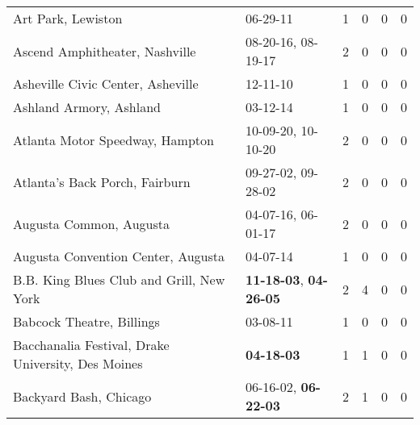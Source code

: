 \begin{longtable}{p{}p{}p{}p{}p{}p{}}
                                                           Art Park, Lewiston &                                                06-29-11\textsuperscript{} &  1 &  0 &  0 &  0 \\
                                               Ascend Amphitheater, Nashville &                    08-20-16\textsuperscript{}, 08-19-17\textsuperscript{} &  2 &  0 &  0 &  0 \\
                                            Asheville Civic Center, Asheville &                                                12-11-10\textsuperscript{} &  1 &  0 &  0 &  0 \\
                                                      Ashland Armory, Ashland &                                                03-12-14\textsuperscript{} &  1 &  0 &  0 &  0 \\
                                              Atlanta Motor Speedway, Hampton &                    10-09-20\textsuperscript{}, 10-10-20\textsuperscript{} &  2 &  0 &  0 &  0 \\
                                               Atlanta's Back Porch, Fairburn &                    09-27-02\textsuperscript{}, 09-28-02\textsuperscript{} &  2 &  0 &  0 &  0 \\
                                                      Augusta Common, Augusta &                    04-07-16\textsuperscript{}, 06-01-17\textsuperscript{} &  2 &  0 &  0 &  0 \\
                                           Augusta Convention Center, Augusta &                                                04-07-14\textsuperscript{} &  1 &  0 &  0 &  0 \\
                                     B.B. King Blues Club and Grill, New York &  \textbf{11-18-03\textsuperscript{}}, \textbf{04-26-05\textsuperscript{}} &  2 &  4 &  0 &  0 \\
                                                    Babcock Theatre, Billings &                                                03-08-11\textsuperscript{} &  1 &  0 &  0 &  0 \\
                           Bacchanalia Festival, Drake University, Des Moines &                                       \textbf{04-18-03\textsuperscript{}} &  1 &  1 &  0 &  0 \\
                                                       Backyard Bash, Chicago &           06-16-02\textsuperscript{}, \textbf{06-22-03\textsuperscript{}} &  2 &  1 &  0 &  0 \\

\end{longtable}
